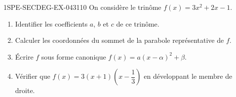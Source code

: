 \begin{exercice}{1SPE-SECDEG-EX-043}{1}{10}
On considère le trinôme $f(x) = 3x^2 + 2x - 1$.

\begin{enumerate}
  \item Identifier les coefficients $a$, $b$ et $c$ de ce trinôme.
  \item Calculer les coordonnées du sommet de la parabole représentative de $f$.
  \item Écrire $f$ sous forme canonique $f(x) = a(x - \alpha)^2 + \beta$.
  \item Vérifier que $f(x) = 3\left(x + 1\right)\!\left(x - \dfrac{1}{3}\right)$ en développant le membre de droite.
\end{enumerate}
\end{exercice}
